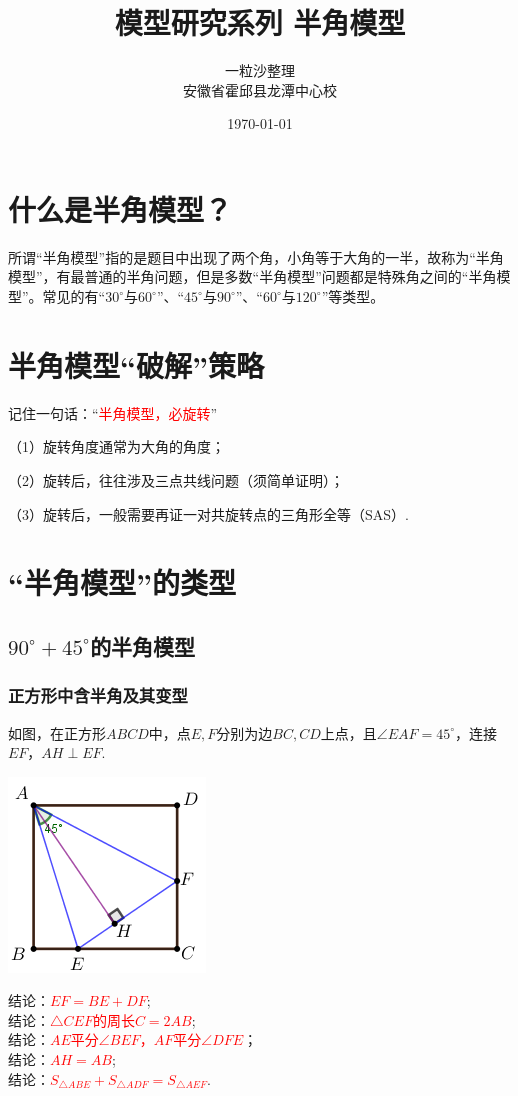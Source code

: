 \documentclass[10pt]{ctexart}
\title{模型研究系列 \quad 半角模型}
\author{一粒沙整理\\安徽省霍邱县龙潭中心校}
\date{\today}
\begin{document}
\maketitle
\tableofcontents


\section{什么是半角模型？}
所谓“半角模型”指的是题目中出现了两个角，小角等于大角的一半，故称为“半角模型”，有最普通的半角问题，但是多数“半角模型”问题都是特殊角之间的“半角模型”。常见的有“$30^\circ$与$60^\circ$”、“$45^\circ$与$90^\circ$”、“$60^\circ$与$120^\circ$”等类型。
\section{半角模型“破解”策略}
记住一句话：“\textcolor{red}{半角模型，必旋转}”
\begin{vuyi}

\kaishu （1）旋转角度通常为大角的角度；

（2）旋转后，往往涉及三点共线问题（须简单证明）；

（3）旋转后，一般需要再证一对共旋转点的三角形全等（SAS）.
\end{vuyi}
\section{“半角模型”的类型}
\subsection{$90^\circ +45^\circ$的半角模型}
\subsubsection{正方形中含半角及其变型}
如图，在正方形$ABCD$中，点$E,F$分别为边$BC,CD$上点，且$\angle EAF=45^\circ$，连接$EF$，$AH\perp EF$.
\begin{minipage}{0.3\textwidth}
	\includegraphics[scale=0.8]{figure/banjiao08}
\end{minipage}
\begin{minipage}{0.4\textwidth}
	结论：\textcolor{red}{$EF=BE+DF$};\\
	结论：\textcolor{red}{$\triangle CEF$的周长$C=2AB$};\\
	结论：\textcolor{red}{$AE$平分$\angle BEF$，$AF$平分$\angle DFE$}；\\
	结论：\textcolor{red}{$AH=AB$};\\
	结论：\textcolor{red}{$S_{\triangle ABE}+S_{\triangle ADF}=S_{\triangle AEF}$}.
\end{minipage}
\end{document}
